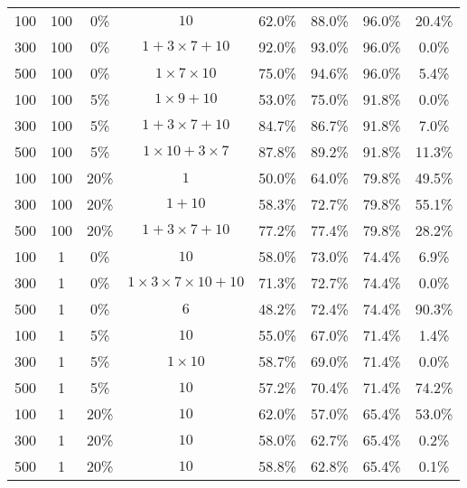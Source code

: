 \begin{table}
\begin{center}
{{\begin{tabular}{|c c  c | c |  c | c c| c | }
100& 	100& 	0\% & 	${10}$ &	62.0\% & 	88.0\% & 	96.0\%    	 &  20.4\%  \\ 
300& 	100& 	0\% & 	${1} + {3} \times {7} + {10}$ &	92.0\% & 	93.0\% & 	96.0\%    	 &  0.0\%  \\ 
500& 	100& 	0\% & 	${1} \times {7} \times {10}$ &	75.0\% & 	94.6\% & 	96.0\%    	 &  5.4\%  \\ \hline
100& 	100& 	5\% & 	${1} \times {9} + {10}$ &	53.0\% & 	75.0\% & 	91.8\%    	 &  0.0\%  \\ 
300& 	100& 	5\% & 	${1} + {3} \times {7} + {10}$ &	84.7\% & 	86.7\% & 	91.8\%    	 &  7.0\%  \\ 
500& 	100& 	5\% & 	${1} \times {10} + {3} \times {7}$ &	87.8\% & 	89.2\% & 	91.8\%    	 &  11.3\%  \\ \hline
100& 	100& 	20\% & 	${1}$ &	50.0\% & 	64.0\% & 	79.8\%    	 &  49.5\%  \\ 
300& 	100& 	20\% & 	${1} + {10}$ &	58.3\% & 	72.7\% & 	79.8\%    	 &  55.1\%  \\ 
500& 	100& 	20\% & 	${1} + {3} \times {7} + {10}$ &	77.2\% & 	77.4\% & 	79.8\%    	 &  28.2\%  \\ \hline
100& 	1& 	0\% & 	${10}$ &	58.0\% & 	73.0\% & 	74.4\%    	 &  6.9\%  \\ 
300& 	1& 	0\% & 	${1} \times {3} \times {7} \times {10} + {10}$ &	71.3\% & 	72.7\% & 	74.4\%    	 &  0.0\%  \\ 
500& 	1& 	0\% & 	${6}$ &	48.2\% & 	72.4\% & 	74.4\%    	 &  90.3\%  \\ \hline
100& 	1& 	5\% & 	${10}$ &	55.0\% & 	67.0\% & 	71.4\%    	 &  1.4\%  \\ 
300& 	1& 	5\% & 	${1} \times {10}$ &	58.7\% & 	69.0\% & 	71.4\%    	 &  0.0\%  \\ 
500& 	1& 	5\% & 	${10}$ &	57.2\% & 	70.4\% & 	71.4\%    	 &  74.2\%  \\ \hline
100& 	1& 	20\% & 	${10}$ &	62.0\% & 	57.0\% & 	65.4\%    	 &  53.0\%  \\ 
300& 	1& 	20\% & 	${10}$ &	58.0\% & 	62.7\% & 	65.4\%    	 &  0.2\%  \\ 
500& 	1& 	20\% & 	${10}$ &	58.8\% & 	62.8\% & 	65.4\%    	 &  0.1\%  \\ 

\hline

\end{tabular}
} }
\end{center}

\end{table}





